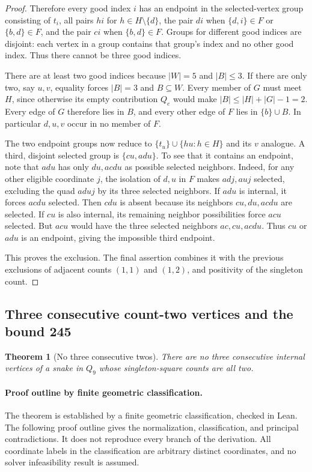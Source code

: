 \documentclass[11pt,a4paper]{article}
\newtheorem{theorem}{Theorem}[section]
\theoremstyle{definition}
\theoremstyle{remark}
\newcommand{\Q}{Q}
\begin{document}
\begin{proof}
Therefore every good index $i$ has an endpoint in the selected-vertex group consisting of $t_i$, all pairs $hi$ for $h\in H\setminus\{d\}$, the pair $di$ when $\{d,i\}\in F$ or $\{b,d\}\in F$, and the pair $ci$ when $\{b,d\}\in F$. Groups for different good indices are disjoint: each vertex in a group contains that group's index and no other good index. Thus there cannot be three good indices.

There are at least two good indices because $|W|=5$ and $|B|\le3$. If there are only two, say $u,v$, equality forces $|B|=3$ and $B\subseteq W$. Every member of $G$ must meet $H$, since otherwise its empty contribution $Q_e$ would make $|B|\le|H|+|G|-1=2$. Every edge of $G$ therefore lies in $B$, and every other edge of $F$ lies in $\{b\}\cup B$. In particular $d,u,v$ occur in no member of $F$.

The two endpoint groups now reduce to $\{t_u\}\cup\{hu:h\in H\}$ and its $v$ analogue. A third, disjoint selected group is $\{cu,adu\}$. To see that it contains an endpoint, note that $adu$ has only $du,acdu$ as possible selected neighbors. Indeed, for any other eligible coordinate $j$, the isolation of $d,u$ in $F$ makes $adj,auj$ selected, excluding the quad $aduj$ by its three selected neighbors. If $adu$ is internal, it forces $acdu$ selected. Then $cdu$ is absent because its neighbors $cu,du,acdu$ are selected. If $cu$ is also internal, its remaining neighbor possibilities force $acu$ selected. But $acu$ would have the three selected neighbors $ac,cu,acdu$. Thus $cu$ or $adu$ is an endpoint, giving the impossible third endpoint.

This proves the exclusion. The final assertion combines it with the previous exclusions of adjacent counts $(1,1)$ and $(1,2)$, and positivity of the singleton count.
\end{proof}


\subsection{Three consecutive count-two vertices and the bound 245}

\begin{theorem}[No three consecutive twos]\label{thm:no-three-twos}
There are no three consecutive internal vertices of a snake in $\Q_9$ whose singleton-square counts are all two.
\end{theorem}

\paragraph{Proof outline by finite geometric classification.}
The theorem is established by a finite geometric classification, checked in Lean. The following proof outline gives the normalization, classification, and principal contradictions. It does not reproduce every branch of the derivation. All coordinate labels in the classification are arbitrary distinct coordinates, and no solver infeasibility result is assumed.
\end{document}
